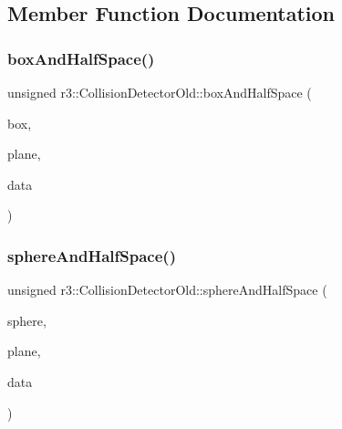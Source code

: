\subsection{Member Function Documentation}
\mbox{\label{classr3_1_1_collision_detector_old_ad1fa9c247235130c96432fc3f5524e8f}} 
\subsubsection{\texorpdfstring{box\+And\+Half\+Space()}{boxAndHalfSpace()}}
{\footnotesize\ttfamily unsigned r3\+::\+Collision\+Detector\+Old\+::box\+And\+Half\+Space (\begin{DoxyParamCaption}\item[{const \mbox{\hyperlink{classr3_1_1_collision_box}{Collision\+Box}} \&}]{box,  }\item[{const \mbox{\hyperlink{classr3_1_1_collision_plane}{Collision\+Plane}} \&}]{plane,  }\item[{\mbox{\hyperlink{classr3_1_1_collision_data_old}{Collision\+Data\+Old}} $\ast$}]{data }\end{DoxyParamCaption})\hspace{0.3cm}{\ttfamily [static]}}

\mbox{\label{classr3_1_1_collision_detector_old_afac2bf8c0034f33fee66979d69da76e7}} 
\subsubsection{\texorpdfstring{sphere\+And\+Half\+Space()}{sphereAndHalfSpace()}}
{\footnotesize\ttfamily unsigned r3\+::\+Collision\+Detector\+Old\+::sphere\+And\+Half\+Space (\begin{DoxyParamCaption}\item[{const \mbox{\hyperlink{classr3_1_1_collision_sphere}{Collision\+Sphere}} \&}]{sphere,  }\item[{const \mbox{\hyperlink{classr3_1_1_collision_plane}{Collision\+Plane}} \&}]{plane,  }\item[{\mbox{\hyperlink{classr3_1_1_collision_data_old}{Collision\+Data\+Old}} $\ast$}]{data }\end{DoxyParamCaption})\hspace{0.3cm}{\ttfamily [static]}}

